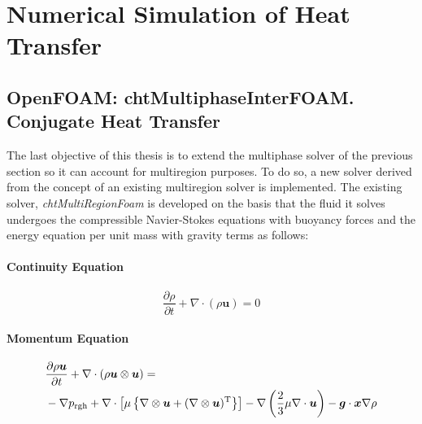 \chapter{Numerical Simulation of Heat Transfer} %

\label{Chapter4}

\section{OpenFOAM: chtMultiphaseInterFOAM. Conjugate Heat Transfer}
The last objective of this thesis is to extend the multiphase solver of the previous section so it can account for multiregion purposes. To do so, a new solver derived from the concept of an existing multiregion solver is implemented. The existing solver, \textit{chtMultiRegionFoam} is developed on the basis that the fluid it solves undergoes the compressible Navier-Stokes equations with buoyancy forces and the energy equation per unit mass with gravity terms as follows:
\subsubsection*{Continuity Equation}
\begin{equation}
\frac{\partial \rho}{\partial t}+\nabla \cdot(\rho \boldsymbol{u})=0
\end{equation}
\subsubsection*{Momentum Equation}
\begin{equation}
	\begin{aligned}
		&\frac{\partial \rho \boldsymbol{u}}{\partial t}+\nabla \cdot(\rho \boldsymbol{u} \otimes \boldsymbol{u})=\\
		&-\nabla p_{\mathrm{rgh}}+\nabla \cdot\left[\mu\left\{\nabla \otimes \boldsymbol{u}+(\nabla \otimes \boldsymbol{u})^{\mathrm{T}}\right\}\right]
		-\nabla\left(\frac{2}{3} \mu \nabla \cdot \boldsymbol{u}\right)-\boldsymbol{g} \cdot \boldsymbol{x} \nabla \rho
	\end{aligned}
\centering
\label{4.1}
\end{equation}
